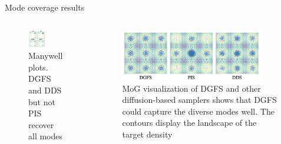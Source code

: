 \documentclass[aspectratio=169,xcolor=dvipsnames]{beamer}
\begin{document}


\begin{frame}[t]{Mode coverage results}

\begin{columns}[t]
\begin{column}{0.48\textwidth}
\begin{figure}
    \centering
    \includegraphics[width=0.5\textwidth]{figures/mode.png}
    \caption{Manywell plots. DGFS and DDS but not PIS recover all modes}
\end{figure}
\end{column}
\begin{column}{0.48\textwidth}
\begin{figure}
    \centering
    \includegraphics[width=0.9\textwidth]{figures/MoG.png}
    \caption{MoG visualization of DGFS and other diffusion-based samplers shows that DGFS could capture the diverse modes well. The contours display the landscape of the target density}
\end{figure}
\end{column}
\end{columns}
    
\end{frame}
\end{document}
